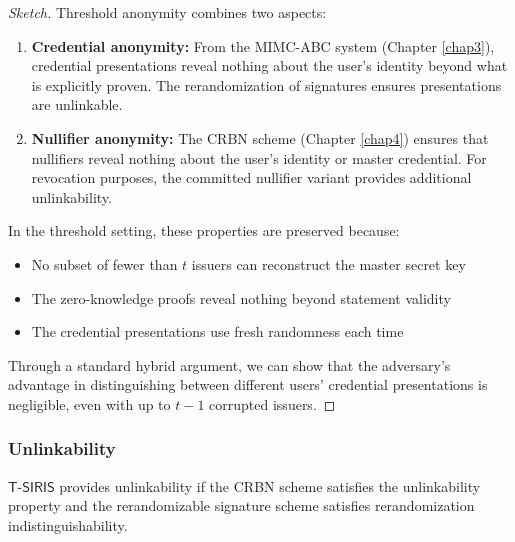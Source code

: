 \begin{proof}[Sketch]
Threshold anonymity combines two aspects:

\begin{enumerate}
    \item \textbf{Credential anonymity:} From the MIMC-ABC system (Chapter \ref{chap3}), credential presentations reveal nothing about the user's identity beyond what is explicitly proven. The rerandomization of signatures ensures presentations are unlinkable.
    
    \item \textbf{Nullifier anonymity:} The CRBN scheme (Chapter \ref{chap4}) ensures that nullifiers reveal nothing about the user's identity or master credential. For revocation purposes, the committed nullifier variant provides additional unlinkability.
\end{enumerate}

In the threshold setting, these properties are preserved because:
\begin{itemize}
    \item No subset of fewer than $t$ issuers can reconstruct the master secret key
    \item The zero-knowledge proofs reveal nothing beyond statement validity
    \item The credential presentations use fresh randomness each time
\end{itemize}

Through a standard hybrid argument, we can show that the adversary's advantage in distinguishing between different users' credential presentations is negligible, even with up to $t-1$ corrupted issuers.
\end{proof}

\subsubsection{Unlinkability}

\begin{theorem}[Unlinkability]
$\mathsf{T\text{-}SIRIS}$ provides unlinkability if the CRBN scheme satisfies the unlinkability property and the rerandomizable signature scheme satisfies rerandomization indistinguishability.
\end{theorem}

